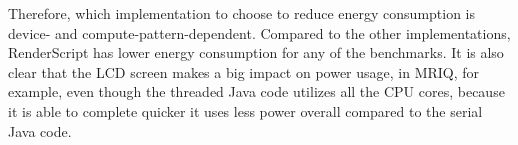 Therefore, which implementation to choose to reduce energy consumption is device- and compute-pattern-dependent.
Compared to the other implementations, RenderScript has lower energy consumption for any of the benchmarks.
It is also clear that the LCD screen makes a big impact on power usage, in MRIQ, for example, even though the threaded Java code
  utilizes all the CPU cores, because it is able to complete quicker it uses less power overall compared to the serial Java code.

